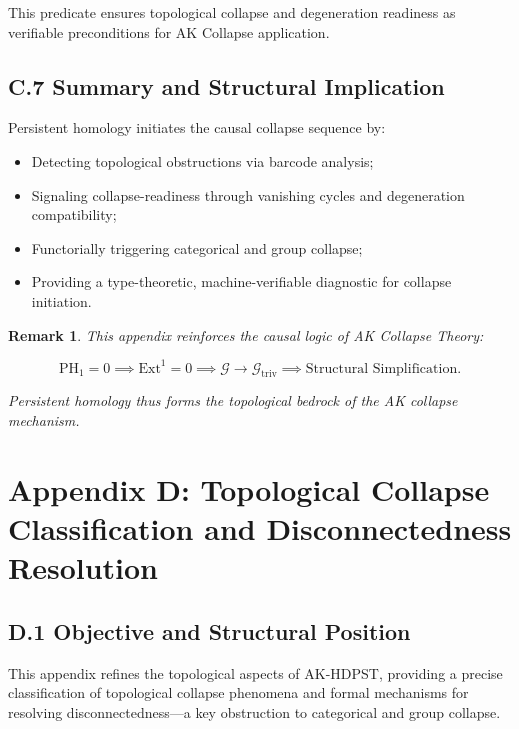 \documentclass[11pt]{article}
\newtheorem{remark}[theorem]{Remark}
\begin{document}
This predicate ensures topological collapse and degeneration readiness as verifiable preconditions for AK Collapse application.

\subsection*{C.7 Summary and Structural Implication}

Persistent homology initiates the causal collapse sequence by:

\begin{itemize}
    \item Detecting topological obstructions via barcode analysis;
    \item Signaling collapse-readiness through vanishing cycles and degeneration compatibility;
    \item Functorially triggering categorical and group collapse;
    \item Providing a type-theoretic, machine-verifiable diagnostic for collapse initiation.
\end{itemize}

\begin{remark}
This appendix reinforces the causal logic of AK Collapse Theory:

\[
\mathrm{PH}_1 = 0 \implies \mathrm{Ext}^1 = 0 \implies \mathcal{G} \longrightarrow \mathcal{G}_{\mathrm{triv}} \implies \text{Structural Simplification}.
\]

Persistent homology thus forms the topological bedrock of the AK collapse mechanism.

\end{remark}



\section*{Appendix D: Topological Collapse Classification and Disconnectedness Resolution}

\subsection*{D.1 Objective and Structural Position}

This appendix refines the topological aspects of AK-HDPST, providing a precise classification of topological collapse phenomena and formal mechanisms for resolving disconnectedness—a key obstruction to categorical and group collapse.
\end{document}
